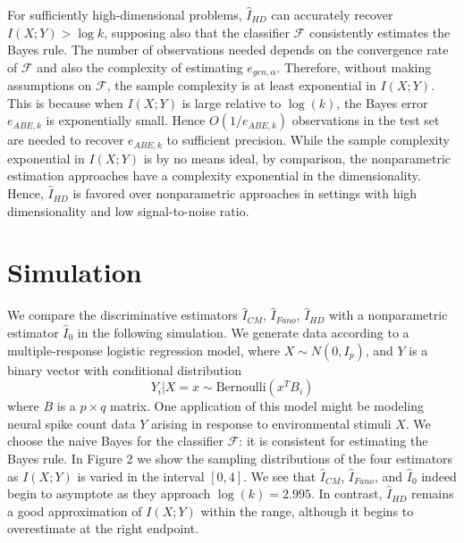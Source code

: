 \documentclass{article}
\begin{document}
For sufficiently high-dimensional problems, $\hat{I}_{HD}$ can accurately recover $I(X; Y) > \log k$,
supposing also that the classifier $\mathcal{F}$ consistently estimates the Bayes rule.
The number of observations needed depends on the convergence rate of $\mathcal{F}$
and also the complexity of estimating $e_{gen, \alpha}$.  Therefore, without making assumptions on $\mathcal{F}$, the sample complexity is at least exponential in $I(X; Y)$.
This is because when $I(X; Y)$ is large relative to $\log(k)$, the Bayes error $e_{ABE, k}$ is exponentially small.  Hence $O(1/e_{ABE, k})$ observations in the test set are needed to recover $e_{ABE, k}$ to sufficient precision.  While the sample complexity exponential in $I(X; Y)$ is by no means ideal,
by comparison, the nonparametric estimation approaches have a complexity exponential in the dimensionality.  Hence, $\hat{I}_{HD}$ is favored over nonparametric approaches in settings
with high dimensionality and low signal-to-noise ratio.


\section{Simulation}

We compare the discriminative estimators $\hat{I}_{CM}$, $\hat{I}_{Fano}$, $\hat{I}_{HD}$
with a nonparametric estimator $\hat{I}_0$ in the following simulation.
We generate data according to a multiple-response logistic regression model, 
where
$
X \sim N(0, I_p)
$,
and $Y$ is a binary vector with conditional distribution
\[
Y_i|X = x \sim \text{Bernoulli}(x^T B_i)
\]
where $B$ is a $p \times q$ matrix.
One application of this model might be modeling neural spike count data $Y$ arising in response
to environmental stimuli $X$.
We choose the naive Bayes for the classifier $\mathcal{F}$: it is consistent for estimating the Bayes rule.
In Figure 2 we show the sampling distributions of the four estimators as $I(X; Y)$ is varied in the interval $[0, 4]$.  We see that $\hat{I}_{CM}$, $\hat{I}_{Fano}$, and $\hat{I}_0$ indeed begin to asymptote as they approach $\log(k) = 2.995$.  In contrast, $\hat{I}_{HD}$ remains a good approximation of $I(X; Y)$ within the range, although it begins to overestimate at the right endpoint.
\end{document}
